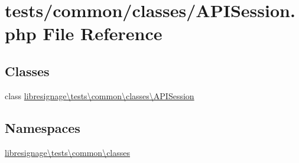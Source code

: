 \hypertarget{APISession_8php}{}\section{tests/common/classes/\+A\+P\+I\+Session.php File Reference}
\label{APISession_8php}
\subsection*{Classes}
\begin{DoxyCompactItemize}
\item 
class \hyperlink{classlibresignage_1_1tests_1_1common_1_1classes_1_1APISession}{libresignage\textbackslash{}tests\textbackslash{}common\textbackslash{}classes\textbackslash{}\+A\+P\+I\+Session}
\end{DoxyCompactItemize}
\subsection*{Namespaces}
\begin{DoxyCompactItemize}
\item 
 \hyperlink{namespacelibresignage_1_1tests_1_1common_1_1classes}{libresignage\textbackslash{}tests\textbackslash{}common\textbackslash{}classes}
\end{DoxyCompactItemize}

